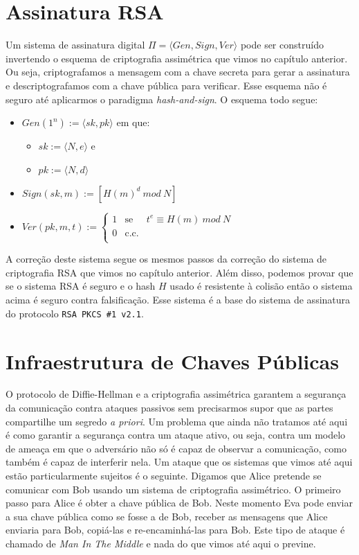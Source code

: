 \section{Assinatura RSA}
\label{sec:assinatura-rsa}

Um sistema de assinatura digital $\Pi = \langle Gen, Sign, Ver \rangle$ pode ser construído invertendo o esquema de criptografia assimétrica que vimos no capítulo anterior.
Ou seja, criptografamos a mensagem com a chave secreta para gerar a assinatura e descriptografamos com a chave pública para verificar.
Esse esquema não é seguro até aplicarmos o paradigma {\em hash-and-sign}.
O esquema todo segue:
\begin{itemize}
\item $Gen(1^n) := \langle sk, pk \rangle$ em que:
\begin{itemize}
\item $sk := \langle N, e \rangle$ e
\item $pk := \langle N, d \rangle$
\end{itemize}
\item $Sign(sk, m) := [H(m)^d\ mod\ N]$
\item $Ver(pk, m, t) := \left\{
    \begin{array}{lcl}
      1 & \textrm{se} & t^e \equiv H(m)\ mod\ N\\
      0 & \textrm{c.c.} &\\
    \end{array}
    \right.$
\end{itemize}

A correção deste sistema segue os mesmos passos da correção do sistema de criptografia RSA que vimos no capítulo anterior.
Além disso, podemos provar que se o sistema RSA é seguro e o hash $H$ usado é resistente à colisão então o sistema acima é seguro contra falsificação.
Esse sistema é a base do sistema de assinatura do protocolo {\tt RSA PKCS \#1 v2.1}.

\section{Infraestrutura de Chaves Públicas}
\label{sec:pki}

O protocolo de Diffie-Hellman e a criptografia assimétrica garantem a segurança da comunicação contra ataques passivos sem precisarmos supor que as partes compartilhe um segredo {\em a priori}.
Um problema que ainda não tratamos até aqui é como garantir a segurança contra um ataque ativo, ou seja, contra um modelo de ameaça em que o adversário não só é capaz de observar a comunicação, como também é capaz de interferir nela.
Um ataque que os sistemas que vimos até aqui estão particularmente sujeitos é o seguinte.
Digamos que Alice pretende se comunicar com Bob usando um sistema de criptografia assimétrico.
O primeiro passo para Alice é obter a chave pública de Bob.
Neste momento Eva pode enviar a sua chave pública como se fosse a de Bob, receber as mensagens que Alice enviaria para Bob, copiá-las e re-encaminhá-las para Bob.
Este tipo de ataque é chamado de {\em Man In The Middle} e nada do que vimos até aqui o previne.

